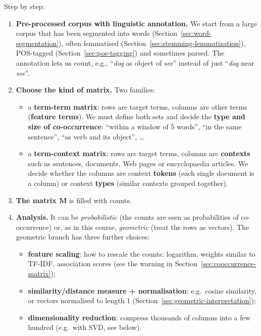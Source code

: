 Step by step:
\begin{enumerate}
  \item \textbf{Pre-processed corpus with linguistic annotation.} We start from a large
        corpus that has been segmented into words
        (Section~\ref{sec:word-segmentation}), often lemmatised
        (Section~\ref{sec:stemming-lemmatization}), POS-tagged
        (Section~\ref{sec:pos-tagging}) and sometimes parsed. The annotation lets us
        count, e.g., ``\emph{dog} as object of \emph{see}'' instead of just ``\emph{dog}
        near \emph{see}''.
  \item \textbf{Choose the kind of matrix.} Two families:
        \begin{itemize}[nosep]
          \item a \textbf{term-term matrix}: rows are target terms, columns are other
                terms (\textbf{feature terms}). We must define both sets and decide the
                \textbf{type and size of co-occurrence}: ``within a window of 5 words'',
                ``in the same sentence'', ``as verb and its object'', \ldots
          \item a \textbf{term-context matrix}: rows are target terms, columns are
                \textbf{contexts} such as sentences, documents, Web pages or encyclopaedia
                articles. We decide whether the columns are context \textbf{tokens} (each
                single document is a column) or context \textbf{types} (similar
                contexts grouped together).
        \end{itemize}
  \item \textbf{The matrix $\mathbf{M}$} is filled with counts.
  \item \textbf{Analysis.} It can be \emph{probabilistic} (the counts are seen as
        probabilities of co-occurrence) or, as in this course, \emph{geometric}
        (treat the rows as vectors). The geometric branch has three further choices:
        \begin{itemize}[nosep]
          \item \textbf{feature scaling}: how to rescale the counts: logarithm,
                weights similar to TF-IDF, association scores (see the warning in
                Section~\ref{sec:cooccurrence-matrix});
          \item \textbf{similarity/distance measure + normalisation}: e.g.\ cosine
                similarity, or vectors normalised to length 1
                (Section~\ref{sec:geometric-interpretation});
          \item \textbf{dimensionality reduction}: compress thousands of columns into a
                few hundred (e.g.\ with SVD, see below).
        \end{itemize}
\end{enumerate}

